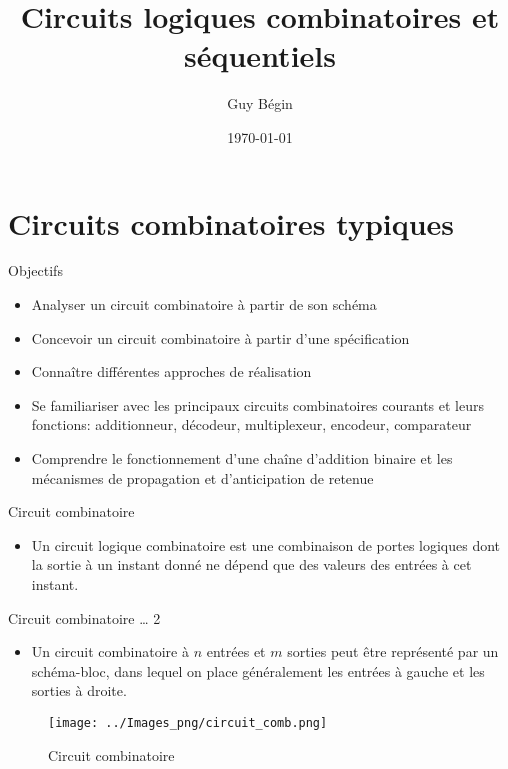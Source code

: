 \documentclass[presentation]{beamer}
\author{Guy Bégin}
\date{\today}
\title{Circuits logiques combinatoires et séquentiels}
\begin{document}
\maketitle

\section{Circuits combinatoires typiques}
\label{sec:orgaa52962}

\begin{frame}[label={sec:org631176e}]{Objectifs}
\begin{itemize}
\item Analyser un circuit combinatoire à partir de son schéma
\item Concevoir un circuit combinatoire à partir d'une spécification
\item Connaître différentes approches de réalisation
\item Se familiariser avec les principaux circuits combinatoires courants et
leurs fonctions: additionneur, décodeur, multiplexeur, encodeur,
comparateur
\item Comprendre le fonctionnement d'une chaîne d'addition binaire et les
mécanismes de propagation et d'anticipation de retenue
\end{itemize}
\end{frame}

\begin{frame}[label={sec:orgf5fa6ee}]{Circuit combinatoire}
\begin{itemize}
\item Un circuit logique combinatoire est une combinaison de portes logiques dont la sortie à un instant donné ne dépend que des valeurs des entrées à cet instant.
\end{itemize}
\end{frame}

\begin{frame}[label={sec:org42cad15}]{Circuit combinatoire \ldots{} 2}
\begin{itemize}
\item Un circuit combinatoire à \(n\) entrées et \(m\) sorties peut être représenté par un schéma-bloc, dans lequel on place généralement les entrées à gauche et les sorties à droite.
\end{itemize}

\begin{figure}[htbp]
\centering
\texttt{[image: ../Images\_png/circuit\_comb.png]}
\caption{\label{fig:org6031571}Circuit combinatoire}
\end{figure}
\end{frame}
\end{document}
